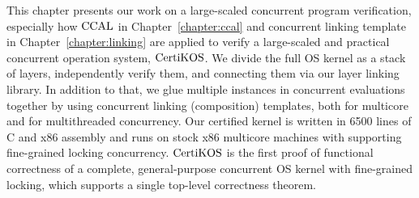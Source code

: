 

This chapter presents our work on a large-scaled concurrent program verification, 
especially 
how $\mathrm{CCAL}$ in Chapter~\ref{chapter:ccal} and concurrent linking template in Chapter~\ref{chapter:linking} are applied 
to verify a large-scaled and practical concurrent operation system, $\mathrm{CertiKOS}$.
We divide the full OS kernel as a stack of layers, independently verify them, 
and connecting them via our layer linking library. 
In addition to that, 
we glue multiple instances in concurrent evaluations together by using concurrent linking (composition) templates, both for multicore and for multithreaded concurrency.  
Our certified kernel is written in 6500 lines of C and x86 assembly
and runs on stock x86 multicore machines with supporting fine-grained locking concurrency. 
$\mathrm{CertiKOS}$ is the first proof of functional correctness of a complete,
general-purpose concurrent OS kernel with fine-grained locking,
which supports a single top-level correctness theorem. 

